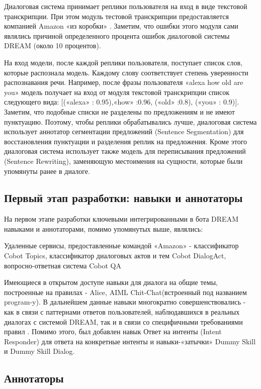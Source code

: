 Диалоговая система принимает реплики пользователя на вход в виде текстовой транскрипции. При этом модуль тестовой транскрипции предоставляется компанией Amazon «из коробки» . Заметим, что ошибки этого модуля сами являлись причиной определенного процента ошибок диалоговой системы DREAM (около 10 процентов).

На вход модели, после каждой реплики пользователя, поступает список слов, которые распознала модель. Каждому слову соответствует степень уверенности распознавания речи. Например, после фразы пользователя «alexa how old are you» модель получает на вход от модуля текстовой транскрипции список следующего вида: [(«alexa» : 0.95),«how» :0.96, («old» :0.8), («you» : 0.9)]. Заметим, что подобные списки не разделены по предложениям и не имеют пунктуацию. Поэтому, чтобы реплики обрабатывались лучше, диалоговая система использует аннотатор сегментации предложений (Sentence Segmentation) для восстановления пунктуации и разделения реплик на предложения. Кроме этого диалоговая система использует также модель для переписывания предложений (Sentence Rewriting), заменяющую местоимения на сущности, которые были упомянуты ранее в диалоге.


\subsection{Первый этап разработки: навыки и аннотаторы}

На первом этапе разработки ключевыми интегрированными в бота {DREAM} навыками и аннотаторами, помимо упомянутых выше, являлись:

Удаленные сервисы, предоставленные командой «Amazon» -  классификатор Cobot Topics, классификатор диалоговых актов и тем Cobot DialogAct, вопросно-ответная система Cobot QA

Имеющиеся в открытом доступе навыки для диалога на общие темы, построенные на правилах - Alice, AIML Chit-Chat(встроенный под названием program-y). В дальнейшем данные навыки многократно совершенствовались - как в связи с паттернами ответов пользователей, наблюдавшихся в реальных диалогах с системой DREAM, так и в связи со специфичными требованиями правил \cite{na_website_ndg}. Помимо этого, был добавлен навык Ответ на интенты (Intent Responder) для ответа на конкретные интенты и навыки-«затычки» Dummy Skill и Dummy Skill Dialog.

\subsection{Аннотаторы}

